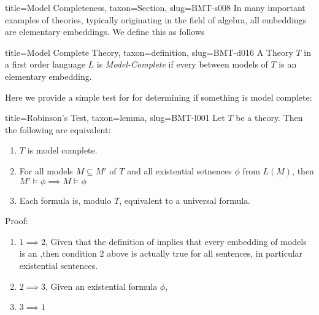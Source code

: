 \documentclass[a4paper]{article}
\begin{document}
  
  
\begin{tree}{title={Model Completeness}, taxon={Section}, slug={BMT-s008}}
In many important examples of theories, typically originating in the field of algebra, all embeddings are elementary embeddings. We define this as follows
\begin{tree}{title={Model Complete Theory}, taxon={definition}, slug={BMT-d016}}
A Theory \(T\) in a first order language \(L\) is \emph{Model-Complete} if  every  between models of \(T\) is an elementary embedding. 
\end{tree}
\par{Here we provide a simple test for for determining if something is model complete:}
\begin{tree}{title={Robinson's Test}, taxon={lemma}, slug={BMT-l001}}
 Let \(T\) be a theory. Then the following are equivalent:\begin{enumerate}
\item{\(T\) is model complete.}
    \item{For all models \(M \subseteq  M'\) of \(T\) and all existential setnences \(\phi\) from \(L(M)\), then \(M' \vDash   \phi   \implies  M  \vDash   \phi\)}
    \item{Each formula is, modulo \(T\), equivalent to a universal formula. }
\end{enumerate}\par{Proof: }\begin{enumerate}
\item{\(1 \implies  2\), Given that the definition of  implies that every embedding of models is an ,then condition 2 above is actually true for all sentences, in particular existential sentences. }
    \item{\(2 \implies  3\), Given an existential formula \(\phi\),  }
    \item{\(3 \implies  1\)}
\end{enumerate}
\end{tree}

\end{tree}


  
  
\end{document}

